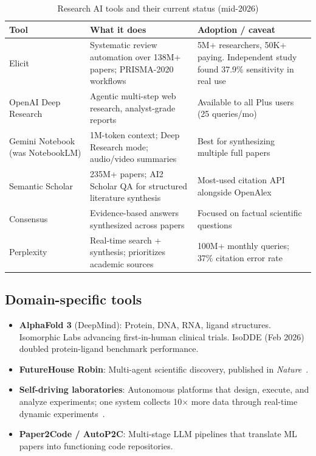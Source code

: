 \documentclass[11pt,a4paper]{article}
\begin{document}
\begin{table}[h]
\centering
\caption{Research AI tools and their current status (mid-2026)}
\label{tab:tools}
\begin{tabular}{L{2.8cm} L{5cm} L{4.5cm}}
\toprule
\textbf{Tool} & \textbf{What it does} & \textbf{Adoption / caveat} \\
\midrule
Elicit & Systematic review automation over 138M+ papers; PRISMA-2020 workflows & 5M+ researchers, 50K+ paying. Independent study found 37.9\% sensitivity in real use~\cite{elicitcochrane2025} \\
OpenAI Deep Research & Agentic multi-step web research, analyst-grade reports & Available to all Plus users (25 queries/mo) \\
Gemini Notebook (was NotebookLM) & 1M-token context; Deep Research mode; audio/video summaries & Best for synthesizing multiple full papers \\
Semantic Scholar & 235M+ papers; AI2 Scholar QA for structured literature synthesis & Most-used citation API alongside OpenAlex \\
Consensus & Evidence-based answers synthesized across papers & Focused on factual scientific questions \\
Perplexity & Real-time search + synthesis; prioritizes academic sources & 100M+ monthly queries; 37\% citation error rate~\cite{perplexity2025} \\
\bottomrule
\end{tabular}
\end{table}

\subsection{Domain-specific tools}

\begin{itemize}
\item \textbf{AlphaFold 3} (DeepMind): Protein, DNA, RNA, ligand structures. Isomorphic Labs advancing first-in-human clinical trials. IsoDDE (Feb 2026) doubled protein-ligand benchmark performance.
\item \textbf{FutureHouse Robin}: Multi-agent scientific discovery, published in \emph{Nature}~\cite{futurehouse2026}.
\item \textbf{Self-driving laboratories}: Autonomous platforms that design, execute, and analyze experiments; one system collects 10$\times$ more data through real-time dynamic experiments~\cite{sdl2025}.
\item \textbf{Paper2Code / AutoP2C}: Multi-stage LLM pipelines that translate ML papers into functioning code repositories.
\end{itemize}
\end{document}
